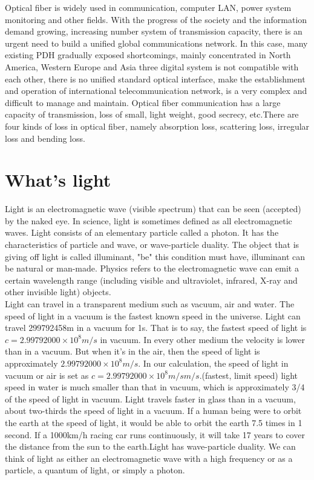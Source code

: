 \documentclass[a4paper]{article}
\begin{document}
Optical fiber is widely used in communication, computer LAN, power system monitoring and other fields. With the progress of the society and the information demand growing, increasing number system of transmission capacity, there is an urgent need to build a unified global communications network. In this case, many existing PDH gradually exposed shortcomings, mainly concentrated in North America, Western Europe and Asia three digital system is not compatible with each other, there is no unified standard optical interface, make the establishment and operation of international telecommunication network, is a very complex and difficult to manage and maintain. Optical fiber communication has a large capacity of transmission, loss of small, light weight, good secrecy, etc.There are four kinds of loss in optical fiber, namely absorption loss, scattering loss, irregular loss and bending loss.

\section{What's light}
\label{sec:Sec2}
Light is an electromagnetic wave (visible spectrum) that can be seen (accepted) by the naked eye. In science, light is sometimes defined as all electromagnetic waves. Light consists of an elementary particle called a photon. It has the characteristics of particle and wave, or wave-particle duality. The object that is giving off light is called illuminant, "be" this condition must have, illuminant can be natural or man-made. Physics refers to the electromagnetic wave can emit a certain wavelength range (including visible and ultraviolet, infrared, X-ray and other invisible light) objects.
\\ 

Light can travel in a transparent medium such as vacuum, air and water. The speed of light in a vacuum is the fastest known speed in the universe. Light can travel 299792458m in a vacuum for 1s. That is to say, the fastest speed of light is $c=2.99792000\times 10^{8} m/s$ in vacuum. In every other medium the velocity is lower than in a vacuum. But when it's in the air, then the speed of light is approximately $2.99792000\times 10^{8} m/s$. In our calculation, the speed of light in vacuum or air is set as $c=2.99792000\times 10^{8} m/s m/s$.(fastest, limit speed) light speed in water is much smaller than that in vacuum, which is approximately 3/4 of the speed of light in vacuum. Light travels faster in glass than in a vacuum, about two-thirds the speed of light in a vacuum. If a human being were to orbit the earth at the speed of light, it would be able to orbit the earth 7.5 times in 1 second. If a 1000km/h racing car runs continuously, it will take 17 years to cover the distance from the sun to the earth.\cite{cJ. Geisler}Light has wave-particle duality. We can think of light as either an electromagnetic wave with a high frequency or as a particle, a quantum of light, or simply a photon.
\\
\end{document}
